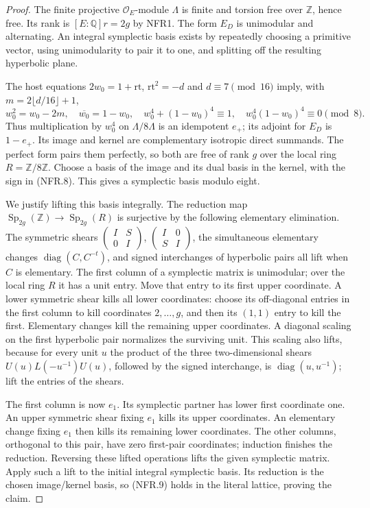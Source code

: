 \documentclass[11pt,a4paper]{article}
\numberwithin{equation}{section}
\theoremstyle{remark}\newtheorem{remark}[theorem]{Remark}
\begin{document}
\begin{proof}
The finite projective $\mathcal O_E$-module $\Lambda$ is finite
and torsion free over $\mathbb Z$, hence free.  Its rank is
$[E:\mathbb Q]r=2g$ by NFR1.  The form $E_D$ is unimodular
and alternating.  An integral symplectic basis exists by repeatedly
choosing a primitive vector, using unimodularity to pair it to one,
and splitting off the resulting hyperbolic plane.

The host equations $2w_0=1+\mathrm{rt}$,
$\mathrm{rt}^2=-d$ and $d\equiv7\pmod {16}$ imply, with
$m=2\lfloor d/16\rfloor+1$,
\[
 w_0^2=w_0-2m,\quad \overline{w_0}=1-w_0,\quad
 w_0^4+(1-w_0)^4\equiv1,\quad
 w_0^4(1-w_0)^4\equiv0\pmod8.
 \tag{NFR.10}
\]
Thus multiplication by $w_0^4$ on $\Lambda/8\Lambda$ is an
idempotent $e_+$; its adjoint for $E_D$ is $1-e_+$.
Its image and kernel are complementary isotropic direct summands.
The perfect form pairs them perfectly, so both are free of rank
$g$ over the local ring $R=\mathbb Z/8\mathbb Z$.
Choose a basis of the image and its dual basis in the kernel,
with the sign in (NFR.8).  This gives a symplectic basis modulo eight.

We justify lifting this basis integrally.  The reduction map
$\operatorname{Sp}_{2g}(\mathbb Z)\to\operatorname{Sp}_{2g}(R)$
is surjective by the following elementary elimination.
The symmetric shears
$\left(\begin{smallmatrix}I&S\\0&I\end{smallmatrix}\right)$,
$\left(\begin{smallmatrix}I&0\\S&I\end{smallmatrix}\right)$,
the simultaneous elementary changes
$\operatorname{diag}(C,C^{-t})$, and signed interchanges of
hyperbolic pairs all lift when $C$ is elementary.
The first column of a symplectic matrix is unimodular; over the
local ring $R$ it has a unit entry.  Move that entry to its first
upper coordinate.  A lower symmetric shear kills all lower
coordinates: choose its off-diagonal entries in the first column
to kill coordinates $2,\ldots,g$, and then its $(1,1)$ entry
to kill the first.  Elementary changes kill the remaining upper
coordinates.  A diagonal scaling on the first hyperbolic pair
normalizes the surviving unit.  This scaling also lifts, because
for every unit $u$ the product of the three two-dimensional shears
$U(u)L(-u^{-1})U(u)$, followed by the signed interchange, is
$\operatorname{diag}(u,u^{-1})$; lift the entries of the shears.

The first column is now $e_1$.  Its symplectic partner has lower
first coordinate one.  An upper symmetric shear fixing $e_1$
kills its upper coordinates.  An elementary change fixing $e_1$
then kills its remaining lower coordinates.  The other columns,
orthogonal to this pair, have zero first-pair coordinates; induction
finishes the reduction.  Reversing these lifted operations lifts
the given symplectic matrix.  Apply such a lift to the initial
integral symplectic basis.  Its reduction is the chosen image/kernel
basis, so (NFR.9) holds in the literal lattice, proving the claim.
\end{proof}
\end{document}

